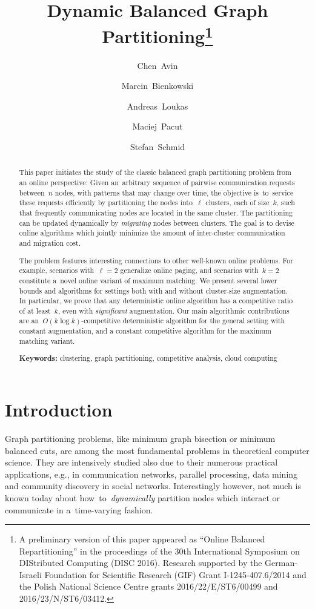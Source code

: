 \documentclass[11pt,a4paper]{scrartcl}
\title{Dynamic Balanced Graph Partitioning\thanks{
A preliminary version of this paper appeared as 
``Online Balanced Repartitioning'' in the proceedings of the
30th International Symposium on DIStributed Computing (DISC 2016).
Research supported by the German-Israeli Foundation for Scientific Research
(GIF) Grant I-1245-407.6/2014 and the Polish National Science Centre grants
2016/22/E/ST6/00499 and 2016/23/N/ST6/03412.}}
\author[1]{Chen~Avin}
\author[2]{Marcin~Bienkowski}
\author[3]{Andreas~Loukas}
\author[2]{Maciej~Pacut}
\author[4]{Stefan~Schmid}
\affil[1]{Ben Gurion University of the Negev, Israel}
\affil[2]{University of Wroclaw, Poland}
\affil[3]{EPFL, Switzerland}
\affil[4]{University of Vienna, Austria}
\date{}
\begin{document}
\maketitle

\vspace{-1.5cm}

\begin{abstract}
This paper initiates the study of the classic balanced graph partitioning
problem from an online perspective: Given an~arbitrary sequence of pairwise
communication requests between~$n$ nodes, with patterns that may change over
time, the objective is~to~service these requests efficiently by partitioning
the nodes into~$\ell$ clusters, each of size~$k$, such that frequently
communicating nodes are located in the same cluster. The partitioning can be
updated dynamically by \emph{migrating} nodes between clusters. The goal is to
devise online algorithms which jointly minimize the amount of inter-cluster
communication and migration cost.

The problem features interesting connections to other well-known online
problems. For example, scenarios with~$\ell=2$ generalize online paging, and
scenarios with~$k=2$ constitute a~novel online variant of maximum matching. We
present several lower bounds and algorithms for settings both with and without
cluster-size augmentation. In particular, we prove that any deterministic
online algorithm has a competitive ratio of at least~$k$, even with
\emph{significant} augmentation. Our main algorithmic contributions are
an~$O(k \log{k})$-competitive deterministic algorithm for the general setting
with constant augmentation, and a constant competitive algorithm for the
maximum matching variant.

\textbf{Keywords: }
clustering, graph partitioning, competitive analysis, cloud computing
\end{abstract}



\section{Introduction}

Graph partitioning problems, like minimum graph bisection or minimum balanced
cuts, are among the most fundamental problems in theoretical computer science.
They are intensively studied also due to their numerous practical
applications, e.g., in communication networks, parallel processing, data
mining and community discovery in social networks. Interestingly however, not
much is known today about how~to~\emph{dynamically} partition nodes which
interact or communicate in a~time-varying fashion.
\end{document}
